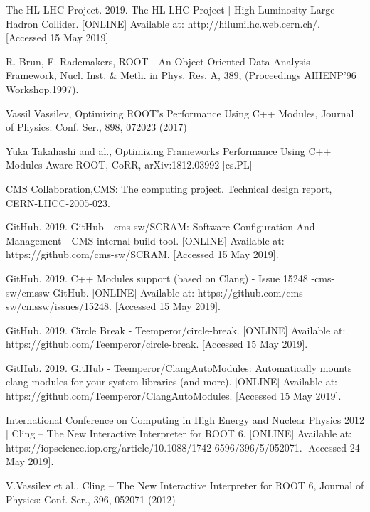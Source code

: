 \documentclass[12pt]{iopart}
\begin{document}
\begin{thebibliography}{10}

The HL-LHC Project. 2019. The HL-LHC Project | High Luminosity Large Hadron Collider. [ONLINE] Available at: http://hilumilhc.web.cern.ch/. [Accessed 15 May 2019]. 

R. Brun, F. Rademakers, ROOT - An Object Oriented Data Analysis Framework, Nucl. Inst. \& Meth. in Phys. Res. A, 389, (Proceedings AIHENP'96 Workshop,1997).

Vassil Vassilev, Optimizing ROOT's Performance Using C++ Modules, Journal of Physics: Conf. Ser., 898, 072023 (2017)

Yuka Takahashi and al., Optimizing Frameworks Performance Using C++ Modules Aware ROOT, CoRR, arXiv:1812.03992 [cs.PL]

CMS Collaboration,CMS: The computing project. Technical design report, CERN-LHCC-2005-023.

GitHub. 2019. GitHub - cms-sw/SCRAM: Software Configuration And Management - CMS internal build tool. [ONLINE] Available at: https://github.com/cms-sw/SCRAM. [Accessed 15 May 2019].

GitHub. 2019. C++ Modules support (based on Clang) - Issue 15248 -cms-sw/cmssw GitHub. [ONLINE] Available at: https://github.com/cms-sw/cmssw/issues/15248. [Accessed 15 May 2019]. 

GitHub. 2019. Circle Break - Teemperor/circle-break. [ONLINE] Available at: https://github.com/Teemperor/circle-break. [Accessed 15 May 2019]. 

GitHub. 2019. GitHub - Teemperor/ClangAutoModules: Automatically mounts clang modules for your system libraries (and more). [ONLINE] Available at: https://github.com/Teemperor/ClangAutoModules. [Accessed 15 May 2019]. 

International Conference on Computing in High Energy and Nuclear Physics 2012 | Cling – The New Interactive Interpreter for ROOT 6. [ONLINE] Available at: https://iopscience.iop.org/article/10.1088/1742-6596/396/5/052071. [Accessed 24 May 2019]. 

V.Vassilev et al., Cling – The New Interactive Interpreter for ROOT 6, Journal of Physics: Conf. Ser., 396, 052071 (2012)

\end{thebibliography}
\end{document}
